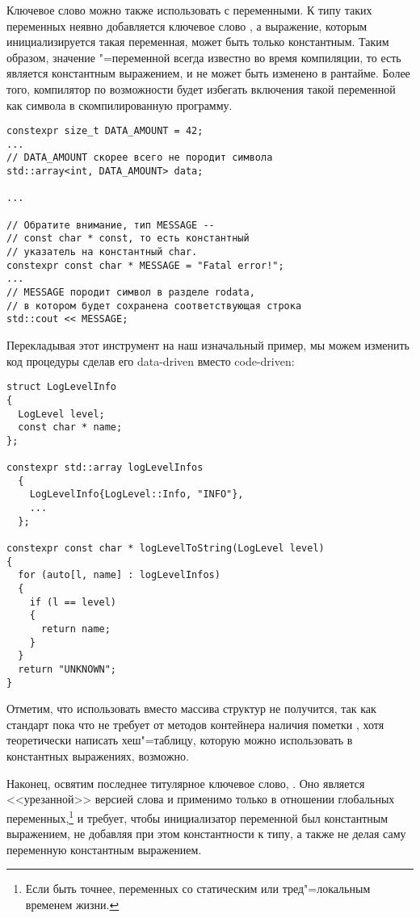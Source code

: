 Ключевое слово  можно также использовать с переменными.
К типу таких переменных неявно добавляется ключевое слово , а выражение, которым инициализируется такая переменная, может быть только константным.
Таким образом, значение "=переменной всегда известно во время компиляции, то есть является константным выражением, и не может быть изменено в рантайме.
Более того, компилятор по возможности будет избегать включения такой переменной как символа в скомпилированную программу.
\begin{verbatim}
constexpr size_t DATA_AMOUNT = 42;
...
// DATA_AMOUNT скорее всего не породит символа
std::array<int, DATA_AMOUNT> data;

...

// Обратите внимание, тип MESSAGE --
// const char * const, то есть константный
// указатель на константный char.
constexpr const char * MESSAGE = "Fatal error!";
...
// MESSAGE породит символ в разделе rodata,
// в котором будет сохранена соответствующая строка
std::cout << MESSAGE;
\end{verbatim}
Перекладывая этот инструмент на наш изначальный пример, мы можем изменить код процедуры  сделав его data-driven вместо code-driven:
\begin{verbatim}
struct LogLevelInfo
{
  LogLevel level;
  const char * name;
};

constexpr std::array logLevelInfos
  {
    LogLevelInfo{LogLevel::Info, "INFO"},
    ...
  };

constexpr const char * logLevelToString(LogLevel level)
{
  for (auto[l, name] : logLevelInfos)
  {
    if (l == level)
    {
      return name;
    }
  }
  return "UNKNOWN";
}
\end{verbatim}
Отметим, что использовать  вместо массива структур не получится, так как стандарт пока что не требует от методов контейнера  наличия пометки , хотя теоретически написать хеш"=таблицу, которую можно использовать в константных выражениях, возможно.

Наконец, освятим последнее титулярное ключевое слово, .
Оно является <<урезанной>> версией слова  и применимо только в отношении глобальных переменных,\footnote{Если быть точнее, переменных со статическим или тред"=локальным временем жизни.} и требует, чтобы инициализатор переменной был константным выражением, не добавляя при этом константности к типу, а также не делая саму переменную константным выражением.


